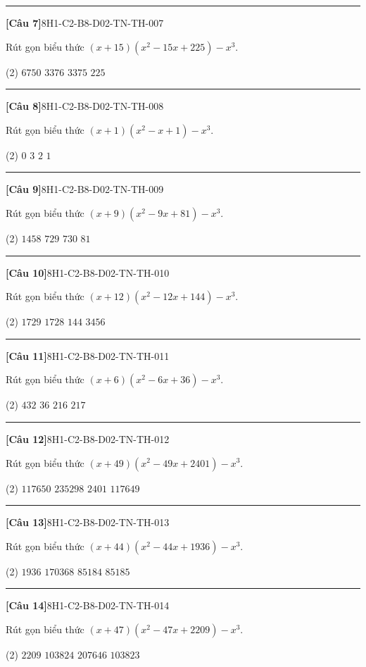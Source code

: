 \documentclass[12pt,a4paper]{article}
\newif\ifloigiai
\newenvironment{cauhoi}[2]{%
  \par\medskip\noindent\rule{\textwidth}{0.4pt}\par\nopagebreak
  \noindent\textbf{[#1]}\hfill{\scriptsize\ttfamily #2}\par\nopagebreak\smallskip}{\par}
\newcommand{\dapan}[1]{\ifloigiai\par\smallskip\noindent\textit{Đáp án:} \textbf{#1}\par\fi}
\begin{document}
\begin{cauhoi}{Câu 7}{8H1-C2-B8-D02-TN-TH-007}
Rút gọn biểu thức $(x+15)(x^{2}-15x+225)-x^{3}$.
\begin{tasks}(2)
\task $6750$
\task $3376$
\task $3375$
\task $225$
\end{tasks}
\dapan{C}
\end{cauhoi}
\begin{cauhoi}{Câu 8}{8H1-C2-B8-D02-TN-TH-008}
Rút gọn biểu thức $(x+1)(x^{2}-x+1)-x^{3}$.
\begin{tasks}(2)
\task $0$
\task $3$
\task $2$
\task $1$
\end{tasks}
\dapan{D}
\end{cauhoi}
\begin{cauhoi}{Câu 9}{8H1-C2-B8-D02-TN-TH-009}
Rút gọn biểu thức $(x+9)(x^{2}-9x+81)-x^{3}$.
\begin{tasks}(2)
\task $1458$
\task $729$
\task $730$
\task $81$
\end{tasks}
\dapan{B}
\end{cauhoi}
\begin{cauhoi}{Câu 10}{8H1-C2-B8-D02-TN-TH-010}
Rút gọn biểu thức $(x+12)(x^{2}-12x+144)-x^{3}$.
\begin{tasks}(2)
\task $1729$
\task $1728$
\task $144$
\task $3456$
\end{tasks}
\dapan{B}
\end{cauhoi}
\begin{cauhoi}{Câu 11}{8H1-C2-B8-D02-TN-TH-011}
Rút gọn biểu thức $(x+6)(x^{2}-6x+36)-x^{3}$.
\begin{tasks}(2)
\task $432$
\task $36$
\task $216$
\task $217$
\end{tasks}
\dapan{C}
\end{cauhoi}
\begin{cauhoi}{Câu 12}{8H1-C2-B8-D02-TN-TH-012}
Rút gọn biểu thức $(x+49)(x^{2}-49x+2401)-x^{3}$.
\begin{tasks}(2)
\task $117650$
\task $235298$
\task $2401$
\task $117649$
\end{tasks}
\dapan{D}
\end{cauhoi}
\begin{cauhoi}{Câu 13}{8H1-C2-B8-D02-TN-TH-013}
Rút gọn biểu thức $(x+44)(x^{2}-44x+1936)-x^{3}$.
\begin{tasks}(2)
\task $1936$
\task $170368$
\task $85184$
\task $85185$
\end{tasks}
\dapan{C}
\end{cauhoi}
\begin{cauhoi}{Câu 14}{8H1-C2-B8-D02-TN-TH-014}
Rút gọn biểu thức $(x+47)(x^{2}-47x+2209)-x^{3}$.
\begin{tasks}(2)
\task $2209$
\task $103824$
\task $207646$
\task $103823$
\end{tasks}
\dapan{D}
\end{cauhoi}
\end{document}

